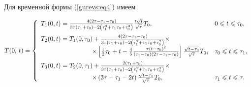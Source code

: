 Для временной формы (\ref{gurevs:eq4}) имеем

\begin{equation}

\label{gurevs:eq11}

T(0,\,t) = \left\{ {\begin{array}{ll}

 T_1 (0,t) = \frac{4\left( {2\tau - \tau _1 - \tau _0 } \right)}{3\tau 

\left( {\tau _1 + \tau _0 } \right) - 2\left( {\tau _1 ^2 + \tau _1 \tau _0 

+ \tau _0 ^2} \right)}\frac{t\sqrt t }{\sqrt \tau }T_0 ,

&

0 \leqslant t \leqslant \tau _0, \vspace{2mm}\\ 

 T_2 (0,t) = T_1 (0,\tau _0 ) + \frac{4\left( {2\tau - \tau _1 - \tau _0 } 

\right)}{3\tau \left( {\tau _1 + \tau _0 } \right) - 2\left( {\tau _1 ^2 + 

\tau _1 \tau _0 + \tau _0 ^2} \right)} \times \\ 

\qquad \qquad \qquad  \qquad \times \left[ {\frac{1}{2}\tau _0 + t - 

\frac{4}{5}\frac{\tau \left( {t - \tau _0 } \right)^2}{\left( {\tau _1 - 

\tau _0 } \right)\left( {2\tau - \tau _1 - \tau _0 } \right)}} 

\right]\frac{\sqrt {t - \tau _0 } }{\sqrt \tau }T_0 ,

&

\tau _0 \leqslant  t \leqslant \tau _1, \vspace{2mm}\\ 

 T_3 (0,t) = T_2 (0,\tau _1 ) + \frac{2\left( {\tau _1 + \tau _0 } 

\right)}{3\tau \left( {\tau _1 + \tau _0 } \right) - 2\left( {\tau _1 ^2 + 

\tau _1 \tau _0 + \tau _0 ^2} \right)} \times \\ 

\qquad \qquad \qquad  \qquad  \times \left( {3\tau - \tau _1 - 2t} 

\right)\frac{\sqrt {t - \tau _1 } }{\sqrt \tau }T_0 , 

&\tau _1 \leqslant t \leqslant \tau. \\ 

 \end{array}} \right.

\end{equation}

